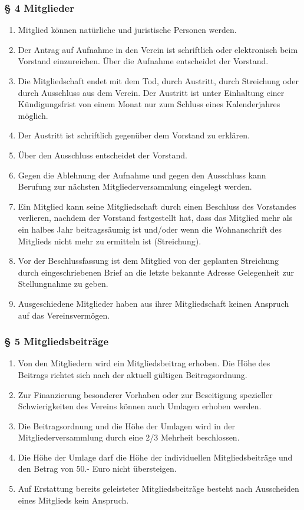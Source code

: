 \documentclass[a4paper,10pt]{article}
\begin{document}
\newpage

\subsubsection*{§ 4 Mitglieder}
\begin{enumerate}
  \item Mitglied können natürliche und juristische Personen werden.
  \item Der Antrag auf Aufnahme in den Verein ist schriftlich oder elektronisch beim
Vorstand einzureichen. Über die Aufnahme entscheidet der Vorstand.
\item Die Mitgliedschaft endet mit dem Tod, durch Austritt, durch Streichung oder
durch Ausschluss aus dem Verein. Der Austritt ist unter Einhaltung einer
Kündigungsfrist von einem Monat nur zum Schluss eines Kalenderjahres möglich.
\item Der Austritt ist schriftlich gegenüber dem Vorstand zu erklären.
\item Über den Ausschluss entscheidet der Vorstand.
\item Gegen die Ablehnung der Aufnahme und gegen den Ausschluss kann Berufung zur
nächsten Mitgliederversammlung eingelegt werden.
\item Ein Mitglied kann seine Mitgliedschaft durch einen Beschluss des Vorstandes
verlieren, nachdem der Vorstand festgestellt hat, dass das Mitglied mehr als ein
halbes Jahr beitragssäumig ist und/oder wenn die Wohnanschrift des Mitglieds
nicht mehr zu ermitteln ist (Streichung).
\item Vor der Beschlussfassung ist dem Mitglied von der geplanten Streichung durch
eingeschriebenen Brief an die letzte bekannte Adresse Gelegenheit zur
Stellungnahme zu geben.
\item Ausgeschiedene Mitglieder haben aus ihrer Mitgliedschaft keinen Anspruch auf das
Vereinsvermögen.
\end{enumerate}



\subsubsection*{§ 5 Mitgliedsbeiträge}
\begin{enumerate}
  \item Von den Mitgliedern wird ein Mitgliedsbeitrag erhoben. Die Höhe des Beitrags
richtet sich nach der aktuell gültigen Beitragsordnung.
\item Zur Finanzierung besonderer Vorhaben oder zur Beseitigung spezieller
Schwierigkeiten des Vereins können auch Umlagen erhoben werden.
\item Die Beitragsordnung und die Höhe der Umlagen wird in der
Mitgliederversammlung durch eine 2/3 Mehrheit beschlossen.
\item Die Höhe der Umlage darf die Höhe der individuellen Mitgliedsbeiträge und den
Betrag von 50.- Euro nicht übersteigen.
\item Auf Erstattung bereits geleisteter Mitgliedsbeiträge besteht nach
  Ausscheiden eines Mitglieds kein Anspruch.
\end{enumerate}
\end{document}
